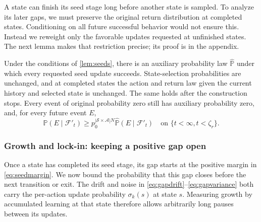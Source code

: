A state can finish its seed stage long before another state is sampled. To analyze its later gaps, we must preserve the original return distribution at completed states. Conditioning on all future successful behavior would not ensure this. Instead we reweight only the favorable updates requested at unfinished states. The next lemma makes that restriction precise; its proof is in the appendix.

\begin{lemma}
\label{lem:measure}
Under the conditions of \autoref{lem:seeds}, there is an auxiliary probability law $\widehat{\mathbb P}$ under which every requested seed update succeeds. State-selection probabilities are unchanged, and at completed states the action and return law given the current history and selected state is unchanged. The same holds after the construction stops. Every event of original probability zero still has auxiliary probability zero, and, for every future event $E$,
\begin{equation}
\label{eq:transfer}
\mathbb P(E\mid\mathcal F'_t)
\ge p_0^{|\mathcal S\times\mathcal A|N}\widehat{\mathbb P}(E\mid\mathcal F'_t)
\quad\text{on }\{t<\infty,t<\zeta_r\}.
\end{equation}
\end{lemma}

\subsubsection{Growth and lock-in: keeping a positive gap open}
Once a state has completed its seed stage, its gap starts at the positive margin in \eqref{eq:seedmargin}. We now bound the probability that this gap closes before the next transition or exit. The drift and noise in \eqref{eq:gapdrift}--\eqref{eq:gapvariance} both carry the per-action update probability $\sigma_k(s)$ at state $s$. Measuring growth by accumulated learning at that state therefore allows arbitrarily long pauses between its updates.

